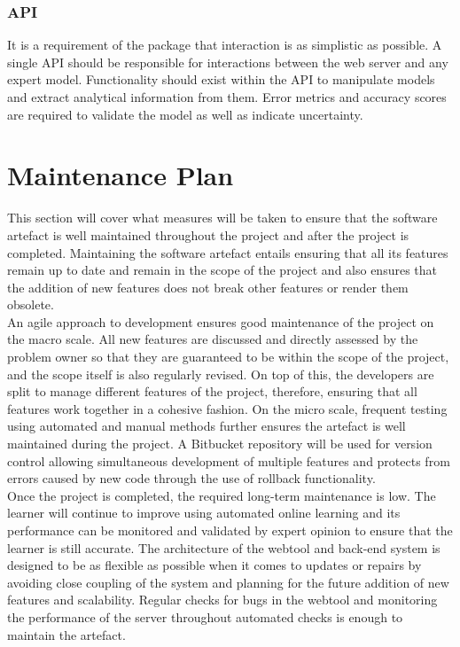 \documentclass{ecmm427_assignment}
\begin{document}
\subsubsection{API}

\quad It is a requirement of the package that interaction is as simplistic as possible. A single API should be responsible for interactions between the web server and any expert model. Functionality should exist within the API to manipulate models and extract analytical information from them. Error metrics and accuracy scores are required to validate the model as well as indicate uncertainty.

\section{Maintenance Plan}
\quad This section will cover what measures will be taken to ensure that the software artefact is well maintained throughout the project and after the project is completed. Maintaining the software artefact entails ensuring that all its features remain up to date and remain in the scope of the project and also ensures that the addition of new features does not break other features or render them obsolete.\\

\quad An agile approach to development ensures good maintenance of the project on the macro scale. All new features are discussed and directly assessed by the problem owner so that they are guaranteed to be within the scope of the project, and the scope itself is also regularly revised. On top of this, the developers are split to manage different features of the project, therefore, ensuring that all features work together in a cohesive fashion. On the micro scale, frequent testing using automated and manual methods further ensures the artefact is well maintained during the project. A Bitbucket repository will be used for version control allowing simultaneous development of multiple features and protects from errors caused by new code through the use of rollback functionality.\\

\quad Once the project is completed, the required long-term maintenance is low. The learner will continue to improve using automated online learning and its performance can be monitored and validated by expert opinion to ensure that the learner is still accurate. The architecture of the webtool and back-end system is designed to be as flexible as possible when it comes to updates or repairs by avoiding close coupling of the system and planning for the future addition of new features and scalability. Regular checks for bugs in the webtool and monitoring the performance of the server throughout automated checks is enough to maintain the artefact.
\end{document}
